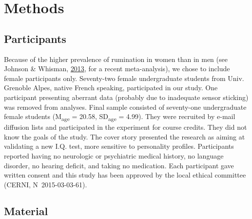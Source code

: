 \documentclass[a4paper,12pt,twoside,onecolumn,openright,final,oldfontcommands]{memoir}
\begin{document}
\hypertarget{methods}{%
\section{Methods}\label{methods}}

\hypertarget{participants}{%
\subsection{Participants}\label{participants}}

Because of the higher prevalence of rumination in women than in men (see Johnson \& Whisman, \protect\hyperlink{ref-Johnson2013}{2013}, for a recent meta-analysis), we chose to include female participants only. Seventy-two female undergraduate students from Univ. Grenoble Alpes, native French speaking, participated in our study. One participant presenting aberrant data (probably due to inadequate sensor sticking) was removed from analyses. Final sample consisted of seventy-one undergraduate female students (M\textsubscript{age} = 20.58, SD\textsubscript{age} = 4.99). They were recruited by e-mail diffusion lists and participated in the experiment for course credits. They did not know the goals of the study. The cover story presented the research as aiming at validating a new I.Q. test, more sensitive to personality profiles. Participants reported having no neurologic or psychiatric medical history, no language disorder, no hearing deficit, and taking no medication. Each participant gave written consent and this study has been approved by the local ethical committee (CERNI, N\textdegree ~2015-03-03-61).

\hypertarget{material}{%
\subsection{Material}\label{material}}
\end{document}
